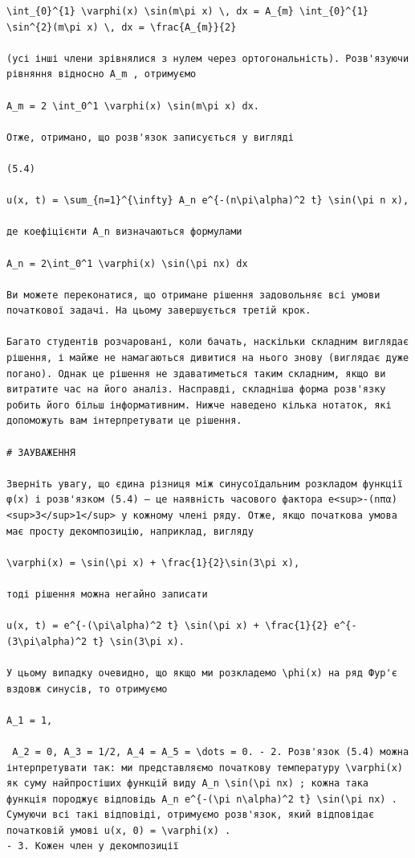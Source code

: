 \documentclass[
  ukrainian,
]{article}
\begin{document}
\begin{verbatim}
\int_{0}^{1} \varphi(x) \sin(m\pi x) \, dx = A_{m} \int_{0}^{1} \sin^{2}(m\pi x) \, dx = \frac{A_{m}}{2}

(усі інші члени зрівнялися з нулем через ортогональність). Розв'язуючи рівняння відносно A_m , отримуємо

A_m = 2 \int_0^1 \varphi(x) \sin(m\pi x) dx.

Отже, отримано, що розв'язок записується у вигляді

(5.4)

u(x, t) = \sum_{n=1}^{\infty} A_n e^{-(n\pi\alpha)^2 t} \sin(\pi n x),

де коефіцієнти A_n визначаються формулами

A_n = 2\int_0^1 \varphi(x) \sin(\pi nx) dx

Ви можете переконатися, що отримане рішення задовольняє всі умови початкової задачі. На цьому завершується третій крок.

Багато студентів розчаровані, коли бачать, наскільки складним виглядає рішення, і майже не намагаються дивитися на нього знову (виглядає дуже погано). Однак це рішення не здаватиметься таким складним, якщо ви витратите час на його аналіз. Насправді, складніша форма розв'язку робить його більш інформативним. Нижче наведено кілька нотаток, які допоможуть вам інтерпретувати це рішення.

# ЗАУВАЖЕННЯ

Зверніть увагу, що єдина різниця між синусоїдальним розкладом функції φ(x) і розв'язком (5.4) — це наявність часового фактора e<sup>-(nπα)<sup>3</sup>1</sup> у кожному члені ряду. Отже, якщо початкова умова має просту декомпозицію, наприклад, вигляду

\varphi(x) = \sin(\pi x) + \frac{1}{2}\sin(3\pi x),

тоді рішення можна негайно записати

u(x, t) = e^{-(\pi\alpha)^2 t} \sin(\pi x) + \frac{1}{2} e^{-(3\pi\alpha)^2 t} \sin(3\pi x).

У цьому випадку очевидно, що якщо ми розкладемо \phi(x) на ряд Фур'є вздовж синусів, то отримуємо

A_1 = 1,

 A_2 = 0, A_3 = 1/2, A_4 = A_5 = \dots = 0. - 2. Розв'язок (5.4) можна інтерпретувати так: ми представляємо початкову температуру \varphi(x) як суму найпростіших функцій виду A_n \sin(\pi nx) ; кожна така функція породжує відповідь A_n e^{-(\pi n\alpha)^2 t} \sin(\pi nx) . Сумуючи всі такі відповіді, отримуємо розв'язок, який відповідає початковій умові u(x, 0) = \varphi(x) .
- 3. Кожен член у декомпозиції


\end{verbatim}
\end{document}

